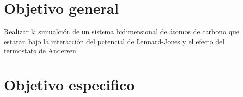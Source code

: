\section{Objetivo general}
Realizar la simualción de un sistema bidimensional de átomos de carbono que estaran bajo la interacción del potencial de 
Lennard-Jones y el efecto del termostato de Andersen.
\section{Objetivo especifico}